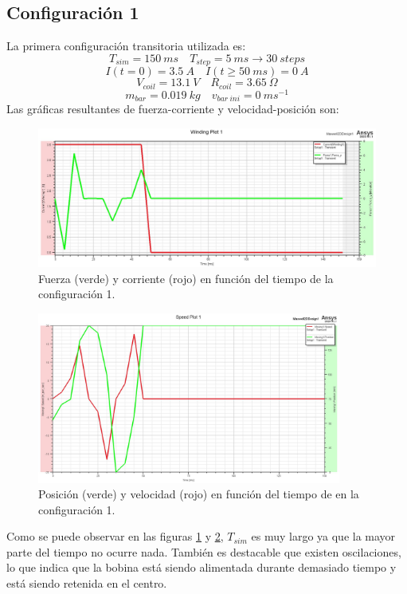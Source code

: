 \subsection*{Configuración 1}
La primera configuración transitoria utilizada es:
\[
T_{sim}=150~ms \quad T_{step}=5~ms \to 30~steps
\]
\[
I(t=0)=3.5~A \quad I(t\geq 50~ms)=0~A
\]
\[
V_{coil}=13.1~V \quad R_{coil}=3.65~\Omega
\]
\[
m_{bar}=0.019~kg \quad v_{bar~ini}=0~ms^{-1}
\]
Las gráficas resultantes de fuerza-corriente y velocidad-posición son:
\begin{figure}[H]
    \centering
    \includegraphics[width=13cm]{FigurasMemoria/S1CurrentForce.jpg}
    \caption{Fuerza (verde) y corriente (rojo) en función del tiempo de la configuración 1.}
    \label{fig:S1CurrentForce} %
\end{figure}
\begin{figure}[H]
    \centering
    \includegraphics[width=10cm]{FigurasMemoria/S1SpeedPosition.jpg}
    \caption{Posición (verde) y velocidad (rojo) en función del tiempo de en la configuración 1.}
    \label{fig:S1SpeedPosition} %
\end{figure}
Como se puede observar en las figuras \ref{fig:S1CurrentForce} y \ref{fig:S1SpeedPosition}, \(T_{sim}\) es muy largo ya que la mayor parte del tiempo no ocurre nada. También es destacable que existen oscilaciones, lo que indica que la bobina está siendo alimentada durante demasiado tiempo y está siendo retenida en el centro.


